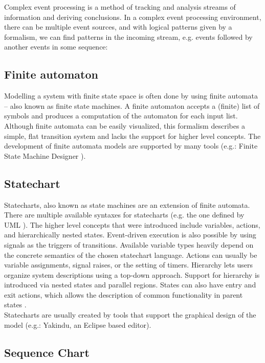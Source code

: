 Complex event processing is a method of tracking and analysis streams of information and deriving conclusions. In a complex event processing environment, there can be multiple event sources, and with logical patterns given by a formalism, we can find patterns in the incoming stream, e.g. events followed by another events in some sequence: \citep{epbas}

\subsection{Finite automaton}

Modelling a system with finite state space is often done by using finite automata -- also known as finite state machines. A finite automaton accepts a (finite) list of symbols and produces a computation of the automaton for each input list.
Although finite automata can be easily visualized, this formalism describes a simple, flat transition system and lacks the support for higher level concepts. The development of finite automata models  are supported by many tools (e.g.: Finite State Machine Designer \citep{yakindu}).

\subsection{Statechart}

Statecharts, also known as state machines are an extension of finite automata. There are multiple available syntaxes for statecharts (e.g. the one defined by UML \citep{stcuml}). The higher level concepts that were introduced include variables, actions, and hierarchically nested states. Event-driven execution is also possible by using signals as the triggers of transitions. Available variable types heavily depend on the concrete semantics of the chosen statechart language. Actions can usually be variable assignments, signal raises, or the setting of timers. Hierarchy lets users organize system descriptions using a top-down approach. Support for hierarchy is introduced via nested states and parallel regions. States can also have entry and exit actions, which allows the description of common functionality in parent states \citep{stcmove}.\\
Statecharts are usually created by tools that support the graphical design of the model (e.g.: Yakindu, an Eclipse based editor).


\subsection{Sequence Chart}

